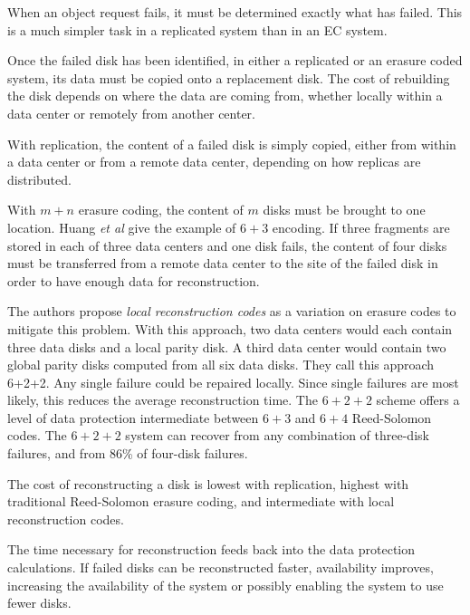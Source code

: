 When an object request fails, it must be determined exactly what has failed. This is a much simpler task in a replicated system than in an EC system.

Once the failed disk has been identified, in either a replicated or an erasure coded system, its data must be copied onto a replacement disk. The cost of rebuilding the disk depends on where the data are coming from, whether locally within a data center or remotely from another center. 

With replication, the content of a failed disk is simply copied, either from within a data center or from a remote data center, depending on how replicas are distributed.

With $m+n$ erasure coding, the content of $m$ disks must be brought to one location. Huang \emph{et al} \cite{lrc} give the example of $6+3$ encoding. If three fragments are stored in each of three data centers and one disk fails, the content of four disks must be transferred from a remote data center to the site of the failed disk in order to have enough data for reconstruction. 

The authors propose \emph{local reconstruction codes} \cite{lrc} as a variation on erasure codes to mitigate this problem. With this approach, two data centers would each contain three data disks and a local parity disk. A third data center would contain two global parity disks computed from all six data disks. They call this approach 6+2+2. Any single failure could be repaired locally. Since single failures are most likely, this reduces the average reconstruction time. The $6+2+2$ scheme offers a level of data protection intermediate between $6+3$ and $6+4$ Reed-Solomon codes. The $6+2+2$ system can recover from any combination of three-disk failures, and from 86\% of four-disk failures.

The cost of reconstructing a disk is lowest with replication, highest with traditional Reed-Solomon erasure coding, and intermediate with local reconstruction codes.

The time necessary for reconstruction feeds back into the data protection calculations. If failed disks can be reconstructed faster, availability improves, increasing the availability of the system or possibly enabling the system to use fewer disks.


